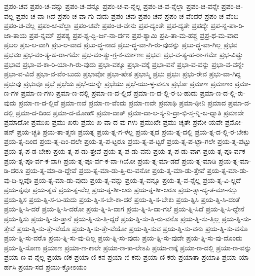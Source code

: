 {ಪ್ರಪಂ-ಚವ
ಪ್ರಪಂ-ಚ-ವನ್ನು
ಪ್ರಪಂ-ಚ-ವನ್ನೂ
ಪ್ರಪಂ-ಚ-ವ-ನ್ನೆಲ್ಲ
ಪ್ರಪಂ-ಚ-ವ-ನ್ನೆಲ್ಲಾ
ಪ್ರಪಂ-ಚ-ವನ್ನೇ
ಪ್ರಪಂ-ಚ-ವಲ್ಲ
ಪ್ರಪಂ-ಚ-ವಾ-ಗಿದೆ
ಪ್ರಪಂ-ಚ-ವಾ-ಗು-ವುದು
ಪ್ರಪಂ-ಚವು
ಪ್ರಪಂ-ಚವೆ
ಪ್ರಪಂ-ಚ-ವೆಂದರೆ
ಪ್ರಪಂ-ಚ-ವೆಂಬ
ಪ್ರಪಂ-ಚ-ವೆಲ್ಲ
ಪ್ರಪಂ-ಚ-ವೆಲ್ಲಾ
ಪ್ರಪಂ-ಚವೇ
ಪ್ರಪಂ-ಚ-ವೇನು
ಪ್ರಪ-ದ್ಯಂತೇ
ಪ್ರಪ-ದ್ಯತೇ
ಪ್ರಪದ್ಯೇ
ಪ್ರಪ-ನ್ನ-ಪಾ-ರಿ-ಜಾ-ತಾಯ
ಪ್ರಪ-ನ್ನಮ್
ಪ್ರಪಶ್ಯ
ಪ್ರಪ-ಶ್ಯ-ದ್ಭಿ-ರ್ಜ-ನಾ-ರ್ದನ
ಪ್ರಪ-ಶ್ಯಾಮಿ
ಪ್ರಪಿ-ತಾ-ಮ-ಹಶ್ಚ
ಪ್ರಪ್ರ-ಥ-ಮ-ವಾದ
ಪ್ರಬಲ
ಪ್ರಬ-ಲ-ವಾಗಿ
ಪ್ರಬ-ಲ-ವಾದ
ಪ್ರಬು-ದ್ಧ-ನಾದ
ಪ್ರಬು-ದ್ಧ-ವಾ-ಗಿ-ರು-ವುದನ್ನು
ಪ್ರಬು-ದ್ಧ-ವಾ-ಗಿಲ್ಲ
ಪ್ರಭವ
ಪ್ರಭವಂ
ಪ್ರಭ-ವಂ-ತ್ಯ-ಹ-ರಾ-ಗಮೇ
ಪ್ರಭ-ವಂ-ತ್ಯು-ಗ್ರ-ಕ-ರ್ಮಾಣಃ
ಪ್ರಭವಃ
ಪ್ರಭ-ವ-ತ್ಯ-ಹ-ರಾ-ಗಮೇ
ಪ್ರಭ-ವಿಷ್ಣು
ಪ್ರಭಾವ
ಪ್ರಭಾ-ವ-ಕಾ-ರಿ-ಯಾ-ಗಿ-ರು-ವುದು
ಪ್ರಭಾ-ವಕ್ಕೂ
ಪ್ರಭಾ-ವಕ್ಕೆ
ಪ್ರಭಾ-ವನೆ
ಪ್ರಭಾ-ವ-ವನ್ನು
ಪ್ರಭಾ-ವ-ವನ್ನೇ
ಪ್ರಭಾ-ವ-ವಿದೆ
ಪ್ರಭಾ-ವ-ವೆಂ-ಬುದು
ಪ್ರಭಾವೋ
ಪ್ರಭಾ-ಷೇತ
ಪ್ರಭಾಸ್ಮಿ
ಪ್ರಭು
ಪ್ರಭುಃ
ಪ್ರಭು-ರೇವ
ಪ್ರಭು-ವಾ-ಗಿದ್ದ
ಪ್ರಭುವು
ಪ್ರಭುವೂ
ಪ್ರಭೆ
ಪ್ರಭೆಯ
ಪ್ರಭೆ-ಯನ್ನೇ
ಪ್ರಭೆಯು
ಪ್ರಭೆ-ಯು-ಳ್ಳ-ವನೂ
ಪ್ರಭೋ
ಪ್ರಮಾಣ
ಪ್ರಮಾಣಂ
ಪ್ರಮಾ-ಣ-ಗಳ
ಪ್ರಮಾ-ಣ-ಗಳು
ಪ್ರಮಾ-ಣ-ದಲ್ಲಿ
ಪ್ರಮಾ-ಣ-ದ-ಲ್ಲಿದೆ
ಪ್ರಮಾ-ಣ-ದ-ಲ್ಲಿ-ರ-ಬ-ಹುದು
ಪ್ರಮಾ-ಣ-ದ-ಲ್ಲಿ-ರು-ವುದು
ಪ್ರಮಾ-ಣ-ದ-ಲ್ಲಿವೆ
ಪ್ರಮಾ-ಣವೆ
ಪ್ರಮಾ-ಣ-ವೆಂದು
ಪ್ರಮಾ-ಣವೇ
ಪ್ರಮಾಥಿ
ಪ್ರಮಾ-ಥೀನಿ
ಪ್ರಮಾದ
ಪ್ರಮಾ-ದ-ದಲ್ಲಿ
ಪ್ರಮಾ-ದ-ದಿಂದ
ಪ್ರಮಾ-ದ-ಮೋಹೌ
ಪ್ರಮಾ-ದಾತ್
ಪ್ರಮಾ-ದಾ-ಲ-ಸ್ಯ-ನಿ-ದ್ರಾ-ಭಿ-ಸ್ತ-ನ್ನಿ-ಬ-ಧ್ನಾತಿ
ಪ್ರಮಾದೇ
ಪ್ರಮಾದೋ
ಪ್ರಮುಖ
ಪ್ರಮು-ಖರು
ಪ್ರಮು-ಖ-ವಾ-ದ-ವು-ಗಳು
ಪ್ರಮುಖೇ
ಪ್ರಮು-ಚ್ಯತೇ
ಪ್ರಮೇ-ಯವೇ
ಪ್ರಮೋ-ಷನ್
ಪ್ರಯ-ಚ್ಛತಿ
ಪ್ರಯ-ತಾ-ತ್ಮನಃ
ಪ್ರಯತ್ನ
ಪ್ರಯ-ತ್ನ-ಗ-ಳೆಲ್ಲ
ಪ್ರಯ-ತ್ನದ
ಪ್ರಯ-ತ್ನ-ದಲ್ಲಿ
ಪ್ರಯ-ತ್ನ-ದ-ಲ್ಲಿ-ರ-ಬೇಕು
ಪ್ರಯ-ತ್ನ-ದಿಂದ
ಪ್ರಯ-ತ್ನ-ದಿಂ-ದಲೇ
ಪ್ರಯ-ತ್ನ-ಪ-ಟ್ಟರೂ
ಪ್ರಯ-ತ್ನ-ಪ-ಟ್ಟರೆ
ಪ್ರಯ-ತ್ನ-ಪ-ಟ್ಟಾ-ಗಲೇ
ಪ್ರಯ-ತ್ನ-ಪಟ್ಟು
ಪ್ರಯ-ತ್ನ-ಪ-ಡ-ಬೇಕು
ಪ್ರಯ-ತ್ನ-ಪ-ಡು-ತ್ತೇವೆ
ಪ್ರಯ-ತ್ನ-ಪ-ಡು-ವನು
ಪ್ರಯ-ತ್ನ-ಪ-ಡು-ವಾಗ
ಪ್ರಯ-ತ್ನ-ಪೂ-ರ್ವಕ
ಪ್ರಯ-ತ್ನ-ಪೂ-ರ್ವ-ಕ-ವಾಗಿ
ಪ್ರಯ-ತ್ನ-ಪೂ-ರ್ವ-ಕ-ವಾ-ಗಿಯೋ
ಪ್ರಯ-ತ್ನ-ಮಾ-ಡದೆ
ಪ್ರಯ-ತ್ನ-ಮಾಡಿ
ಪ್ರಯ-ತ್ನ-ಮಾ-ಡಿ-ದರೂ
ಪ್ರಯ-ತ್ನ-ಮಾ-ಡಿ-ದ್ದೇವೆ
ಪ್ರಯ-ತ್ನ-ಮಾ-ಡು-ತ್ತಿ-ರು-ವನೋ
ಪ್ರಯ-ತ್ನ-ಮಾ-ಡು-ತ್ತೇವೆ
ಪ್ರಯ-ತ್ನ-ಮಾ-ಡು-ವು-ದಿ-ಲ್ಲವೊ
ಪ್ರಯ-ತ್ನ-ಮಾ-ಡು-ವುದು
ಪ್ರಯ-ತ್ನ-ವನ್ನು
ಪ್ರಯ-ತ್ನ-ವನ್ನೂ
ಪ್ರಯ-ತ್ನ-ವ-ನ್ನೆಲ್ಲ
ಪ್ರಯ-ತ್ನ-ವಿ-ಲ್ಲದೆ
ಪ್ರಯ-ತ್ನವೂ
ಪ್ರಯ-ತ್ನವೆ
ಪ್ರಯ-ತ್ನ-ವೆಲ್ಲ
ಪ್ರಯ-ತ್ನ-ಶೀ-ಲರು
ಪ್ರಯ-ತ್ನ-ಶೀ-ಲರೂ
ಪ್ರಯ-ತ್ನಾ-ದ್ಯ-ತ-ಮಾ-ನಸ್ತು
ಪ್ರಯ-ತ್ನಿಸ
ಪ್ರಯ-ತ್ನಿ-ಸ-ಬ-ಹುದು
ಪ್ರಯ-ತ್ನಿ-ಸ-ಬೇ-ಕಾ-ದರೆ
ಪ್ರಯ-ತ್ನಿ-ಸ-ಬೇಕು
ಪ್ರಯ-ತ್ನಿಸಿ
ಪ್ರಯ-ತ್ನಿ-ಸಿ-ದಂತೆ
ಪ್ರಯ-ತ್ನಿ-ಸಿ-ದರೆ
ಪ್ರಯ-ತ್ನಿ-ಸಿ-ದರೋ
ಪ್ರಯ-ತ್ನಿ-ಸಿ-ದಾಗ
ಪ್ರಯ-ತ್ನಿ-ಸಿ-ದಾ-ಗಲೆ
ಪ್ರಯ-ತ್ನಿ-ಸಿದೆ
ಪ್ರಯ-ತ್ನಿ-ಸಿ-ದ್ದೇನೆ
ಪ್ರಯ-ತ್ನಿಸು
ಪ್ರಯ-ತ್ನಿ-ಸು-ತ್ತಾನೆ
ಪ್ರಯ-ತ್ನಿ-ಸು-ತ್ತಿ-ದ್ದರೆ
ಪ್ರಯ-ತ್ನಿ-ಸು-ತ್ತಿ-ರು-ವನೊ
ಪ್ರಯ-ತ್ನಿ-ಸು-ತ್ತಿಲ್ಲ
ಪ್ರಯ-ತ್ನಿ-ಸು-ತ್ತೇವೆ
ಪ್ರಯ-ತ್ನಿ-ಸು-ತ್ತೇ-ವೆಯೊ
ಪ್ರಯ-ತ್ನಿ-ಸು-ತ್ತೇ-ವೆಯೋ
ಪ್ರಯ-ತ್ನಿ-ಸುವ
ಪ್ರಯ-ತ್ನಿ-ಸು-ವನು
ಪ್ರಯ-ತ್ನಿ-ಸು-ವನೊ
ಪ್ರಯ-ತ್ನಿ-ಸು-ವರೊ
ಪ್ರಯ-ತ್ನಿ-ಸು-ವು-ದಿಲ್ಲ
ಪ್ರಯ-ತ್ನಿ-ಸು-ವುದು
ಪ್ರಯ-ತ್ನಿ-ಸು-ವುದೇ
ಪ್ರಯ-ತ್ನಿ-ಸು-ವು-ದೊಂದು
ಪ್ರಯ-ತ್ನಿ-ಸೋಣ
ಪ್ರಯಾಣ
ಪ್ರಯಾ-ಣ-ಕಾಲೇ
ಪ್ರಯಾ-ಣ-ಕಾ-ಲೇಽಪಿ
ಪ್ರಯಾ-ಣಕ್ಕೆ
ಪ್ರಯಾ-ಣ-ದಲ್ಲಿ
ಪ್ರಯಾ-ಣ-ವನ್ನು
ಪ್ರಯಾ-ಣ-ವ-ನ್ನೆಲ್ಲ
ಪ್ರಯಾ-ಣಿಕ
ಪ್ರಯಾ-ಣಿ-ಕನ
ಪ್ರಯಾ-ಣಿ-ಕನು
ಪ್ರಯಾ-ಣಿ-ಕರು
ಪ್ರಯಾತಾ
ಪ್ರಯಾತಿ
ಪ್ರಯಾ-ಯಾ-ರ್ಹಸಿ
ಪ್ರಯಾ-ಸದ
ಪ್ರಯು-ಕ್ತೋಽಯಂ
}
